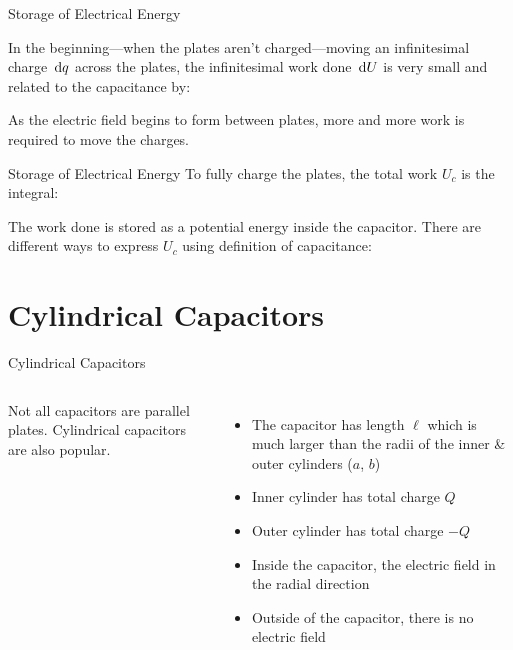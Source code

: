 \documentclass[12pt,aspectratio=169]{beamer}
\begin{document}
\begin{frame}{Storage of Electrical Energy}
  \begin{center}
  \end{center}
  In the beginning---when the plates aren't charged---moving an infinitesimal
  charge $\dl q$ across the plates, the infinitesimal work done $\dl U$ is very
  small and related to the capacitance by:

  
  As the electric field begins to form between plates, more and more work
  is required to move the charges.
\end{frame}



\begin{frame}{Storage of Electrical Energy}
  To fully charge the plates, the total work $U_c$ is the integral:


  The work done is stored as a potential energy inside the capacitor. There are
  different ways to express $U_c$ using definition of capacitance:

\end{frame}


\section{Cylindrical Capacitors}

\begin{frame}{Cylindrical Capacitors}
  \begin{columns}

    Not all capacitors are parallel plates. Cylindrical capacitors are also
    popular.
    \begin{itemize}
    \item The capacitor has length $\ell$ which is much larger than the radii
      of the inner \& outer cylinders ($a$, $b$)
    \item Inner cylinder has total charge $Q$
    \item Outer cylinder has total charge $-Q$
    \item Inside the capacitor, the electric field in the radial direction
    \item Outside of the capacitor, there is no electric field
    \end{itemize}
  \end{columns}
\end{frame}
\end{document}
